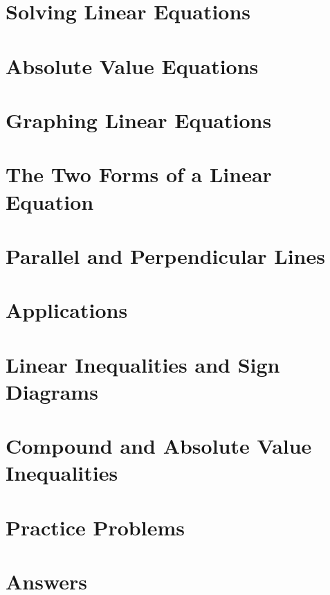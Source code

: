 
\section{Solving Linear Equations}

\newpage

\newpage

\newpage

\newpage

\section{Absolute Value Equations}

\newpage

\section{Graphing Linear Equations}

\newpage

\newpage

\newpage

\section{The Two Forms of a Linear Equation}

\newpage

\newpage

\section{Parallel and Perpendicular Lines}

\newpage

\section{Applications}

\newpage

\newpage

\newpage

\section{Linear Inequalities and Sign Diagrams}

\newpage

\newpage

\section{Compound and Absolute Value Inequalities}

\newpage

\newpage

\section{Practice Problems}

\newpage

\section{Answers}

\newpage
\closegraphsfile